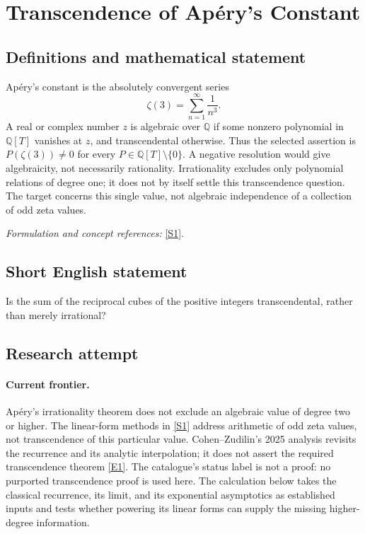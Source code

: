\documentclass[11pt,a4paper]{article}
\newcommand{\Q}{\mathbb{Q}}
\newcommand{\sref}[2]{\hyperlink{source:#1:#2}{[S#2]}}
\newcommand{\eref}[2]{\hyperlink{extra:#1:#2}{[E#2]}}
\newif\ifshowcatalogue
\newcommand{\cataloguescope}[1]{\ifshowcatalogue
 \paragraph{Exact scope in the supplied catalogue.}
 \begin{quote}\small #1\end{quote}\fi}
\numberwithin{equation}{section}
\begin{document}
\setcounter{section}{0}
\clearpage
\section*{\texorpdfstring{Transcendence of Apéry's Constant}{Transcendence of Apéry's Constant}}\label{1283}
\subsection{Definitions and mathematical statement}
Ap\'ery's constant is the absolutely convergent series
\[
 \zeta(3)=\sum_{n=1}^{\infty}\frac1{n^3}.
\]
A real or complex number $z$ is algebraic over $\Q$ if some nonzero polynomial in $\Q[T]$ vanishes at $z$, and transcendental otherwise. Thus the selected assertion is
$P(\zeta(3))\ne0$ for every $P\in\Q[T]\setminus\{0\}$.
A negative resolution would give algebraicity, not necessarily rationality. Irrationality excludes only polynomial relations of degree one; it does not by itself settle this transcendence question. The target concerns this single value, not algebraic independence of a collection of odd zeta values.
\par\smallskip\textit{Formulation and concept references:} \sref{1283}{1}.
\cataloguescope{Prove or disprove that the value zeta(3) is transcendental over the rational numbers.}
\subsection{Short English statement}
Is the sum of the reciprocal cubes of the positive integers transcendental, rather than merely irrational?
\subsection{Research attempt}

\paragraph{Current frontier.}
Ap\'ery's irrationality theorem does not exclude an algebraic value of degree two or higher. The linear-form methods in \sref{1283}{1} address arithmetic of odd zeta values, not transcendence of this particular value. Cohen--Zudilin's 2025 analysis revisits the recurrence and its analytic interpolation; it does not assert the required transcendence theorem \eref{1283}{1}. The catalogue's status label is not a proof: no purported transcendence proof is used here. The calculation below takes the classical recurrence, its limit, and its exponential asymptotics as established inputs and tests whether powering its linear forms can supply the missing higher-degree information.
\end{document}
